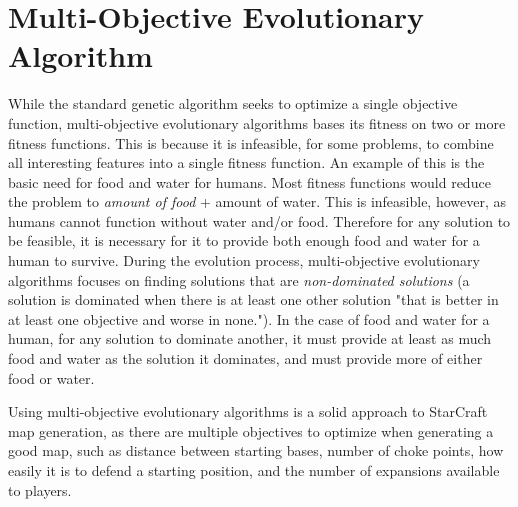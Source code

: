 \section{Multi-Objective Evolutionary Algorithm}
\label{methodology_moea}
While the standard genetic algorithm seeks to optimize a single objective function, multi-objective evolutionary algorithms bases its fitness on two or more fitness functions. This is because it is infeasible, for some problems, to combine all interesting features into a single fitness function. An example of this is the basic need for food and water for humans. Most fitness functions would reduce the problem to \textit{amount of food} + {amount of water}. This is infeasible, however, as humans cannot function without water and/or food. Therefore for any solution to be feasible, it is necessary for it to provide both enough food and water for a human to survive. During the evolution process, multi-objective evolutionary algorithms focuses on finding solutions that are 
\textit{non-dominated solutions} (a solution is dominated when there is at least one other solution "that is better in at least one objective and worse in none."\cite{Togelius2013Controllable}). In the case of food and water for a human, for any solution to dominate another, it must provide at least as much food and water as the solution it dominates, and must provide more of either food or water.

Using multi-objective evolutionary algorithms is a solid approach to StarCraft map generation, as there are multiple objectives to optimize when generating a good map, such as distance between starting bases, number of choke points, how easily it is to defend a starting position, and the number of expansions available to players.